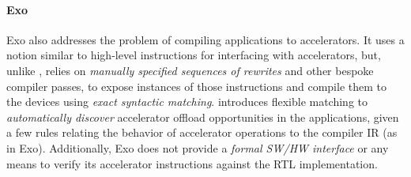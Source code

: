 \paragraph{Exo~\cite{ExoPldi22}} 
Exo also addresses the problem of compiling applications to accelerators. It uses a notion similar to high-level instructions for interfacing with accelerators, but, unlike \TLA, relies on \emph{manually specified sequences of rewrites} and other bespoke compiler passes, to expose instances of those instructions and compile them to the devices using \emph{exact syntactic matching}. 
\TLA introduces flexible matching to \emph{automatically discover} accelerator offload opportunities in the applications, given a few rules relating the behavior of accelerator operations to the compiler IR (as in Exo). 
Additionally, Exo does not provide a \emph{formal SW/HW interface} or any means to verify its accelerator instructions against the RTL implementation.

